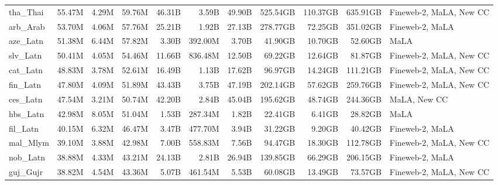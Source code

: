 \begin{table*}[!htp]
{\begin{tabular}{l|rrr|rrr|rrr|l}
tha\_Thai                   & 55.47M     & 4.29M        & 59.76M      & 46.31B       & 3.59B          & 49.90B        & 525.54GB   & 110.37GB     & 635.91GB    & Fineweb-2, MaLA, New CC \\
arb\_Arab                   & 53.70M     & 4.06M        & 57.76M      & 25.21B       & 1.92B          & 27.13B        & 278.77GB   & 72.25GB      & 351.02GB    & Fineweb-2, MaLA         \\
aze\_Latn                   & 51.38M     & 6.44M        & 57.82M      & 3.30B        & 392.00M        & 3.70B         & 41.90GB    & 10.70GB      & 52.60GB     & MaLA                    \\
slv\_Latn                   & 50.41M     & 4.05M        & 54.46M      & 11.66B       & 836.48M        & 12.50B        & 69.22GB    & 12.64GB      & 81.87GB     & Fineweb-2, MaLA, New CC \\
cat\_Latn                   & 48.83M     & 3.78M        & 52.61M      & 16.49B       & 1.13B          & 17.62B        & 96.97GB    & 14.24GB      & 111.21GB    & Fineweb-2, MaLA, New CC \\
fin\_Latn                   & 47.80M     & 4.09M        & 51.89M      & 43.43B       & 3.75B          & 47.19B        & 202.14GB   & 57.62GB      & 259.76GB    & Fineweb-2, MaLA, New CC \\
ces\_Latn                   & 47.54M     & 3.21M        & 50.74M      & 42.20B       & 2.84B          & 45.04B        & 195.62GB   & 48.74GB      & 244.36GB    & MaLA, New CC            \\
hbs\_Latn                   & 42.98M     & 8.05M        & 51.04M      & 1.53B        & 287.34M        & 1.82B         & 22.41GB    & 6.41GB       & 28.82GB     & MaLA                    \\
fil\_Latn                   & 40.15M     & 6.32M        & 46.47M      & 3.47B        & 477.70M        & 3.94B         & 31.22GB    & 9.20GB       & 40.42GB     & Fineweb-2, MaLA         \\
mal\_Mlym                   & 39.10M     & 3.88M        & 42.98M      & 7.00B        & 558.83M        & 7.56B         & 94.47GB    & 18.30GB      & 112.78GB    & Fineweb-2, MaLA, New CC \\
nob\_Latn                   & 38.88M     & 4.33M        & 43.21M      & 24.13B       & 2.81B          & 26.94B        & 139.85GB   & 66.29GB      & 206.15GB    & Fineweb-2, MaLA         \\
guj\_Gujr                   & 38.82M     & 4.54M        & 43.36M      & 5.07B        & 461.54M        & 5.53B         & 60.08GB    & 13.49GB      & 73.57GB     & Fineweb-2, MaLA, New CC \\

\end{tabular}}
\end{table*}
